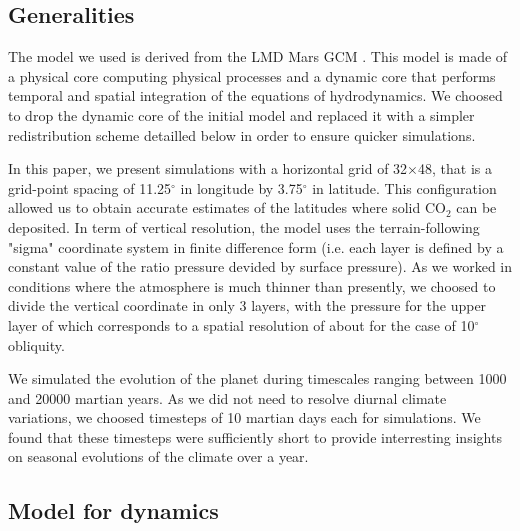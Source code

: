 \label{sc:model}
\label{sc:physi}


\subsection{Generalities}

\label{sc:dynam}
\label{sc:dynamic}

The model we used is derived from the LMD Mars GCM \cite[]{Forg:99}. This model is made of a
physical core computing physical processes and a dynamic core that performs temporal and 
spatial integration of the equations of hydrodynamics. We choosed to drop the dynamic core of
the initial model and replaced it with a simpler redistribution scheme detailled below in 
order to ensure quicker simulations.

In this paper, we present simulations with a horizontal grid of 32$\times$48, that is a 
grid-point spacing of 11.25$^{\circ}$ in longitude by 3.75$^{\circ}$ in latitude. This 
configuration allowed us to obtain accurate estimates of the latitudes where solid CO$_2$
can be deposited. In term of vertical resolution, the model uses the terrain-following 
"sigma" coordinate system in finite difference form (i.e. each layer is defined by a 
constant value of the ratio pressure devided by surface pressure). As we worked in 
conditions where the atmosphere is much thinner than presently, we choosed to divide the
vertical coordinate in only 3 layers, with the pressure for the upper layer of %
which corresponds to a spatial resolution of about %
for the case of 10$^{\circ}$ obliquity.

We simulated the evolution of the planet during timescales ranging between 1000 and 20000
martian years. As we did not need to resolve diurnal climate variations, we choosed timesteps
of 10 martian days each for simulations. We found that these timesteps were sufficiently 
short to provide interresting insights on seasonal evolutions of the climate over a year.


\subsection{Model for dynamics}
\label{sc:model_dynamics}

